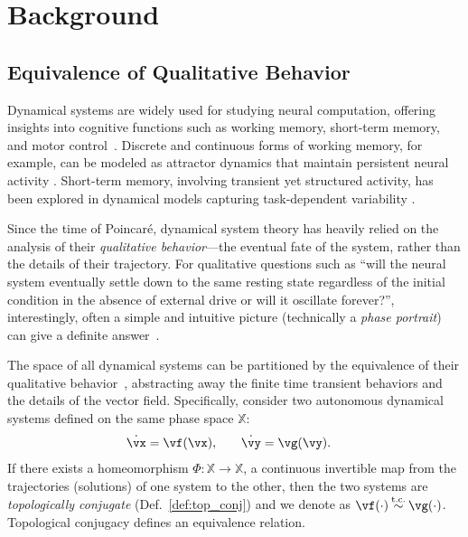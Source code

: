 \documentclass{article}
\theoremstyle{definition} \newtheorem{definition}{Definition}  \newtheorem{example}{Example}
\theoremstyle{remark} \newtheorem{remark}{Remark}
\newcounter{ct}
\newcommand{\tconju}{\mathbin{\overset{\text{t.c.}}{\sim}}}
\newcommand{\inputSpace}{\mathbb{X}}
\newcommand{\homeo}{\Phi} %
\begin{document}
\section{Background}
\subsection{Equivalence of Qualitative Behavior}
Dynamical systems are widely used for studying neural computation, offering insights into cognitive functions such as working memory, short-term memory, and motor control~\citep{beer1995ctrnn, beer2006parameterspace, sussillo2014neural, vyas2020ctd}.
Discrete and continuous forms of working memory, for example, can be modeled as attractor dynamics that maintain persistent neural activity \citep{zhang2022translation, hoeller2024bridging}.
Short-term memory, involving transient yet structured activity, has been explored in dynamical models capturing task-dependent variability \citep{kurtkaya2025dynamical}.

Since the time of Poincar\'e, dynamical system theory has heavily relied on the analysis of their \emph{qualitative behavior}---the eventual fate of the system, rather than the details of their trajectory.
For qualitative questions such as ``will the neural system eventually settle down to the same resting state regardless of the initial condition in the absence of external drive or will it oscillate forever?'', interestingly, often a simple and intuitive picture (technically a \emph{phase portrait}) can give a definite answer~\citep{Strogatz2000-tf}.

The space of all dynamical systems can be partitioned by the equivalence of their qualitative behavior~\citep{Arnold1994}, abstracting away the finite time transient behaviors and the details of the vector field.
Specifically, consider two autonomous dynamical systems defined on the same phase space $\inputSpace$:
\begin{align}
    \dot{\vx} = \vf(\vx),
    &\qquad
    \dot{\vy} = \vg(\vy).
\end{align}
If there exists a homeomorphism $\homeo: \inputSpace \to \inputSpace$, a continuous invertible map from the trajectories (solutions) of one system to the other, then the two systems are \emph{topologically conjugate} (Def.~\ref{def:top_conj}) and we denote as $\vf(\cdot) \tconju \vg(\cdot)$.
Topological conjugacy defines an equivalence relation.
\end{document}
